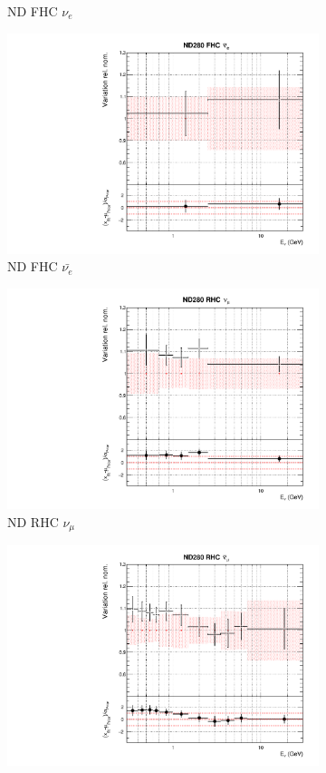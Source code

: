 \begin{figure}
\begin{subfigure}{0.45\textwidth}
  \caption{ND FHC $\nu_{e}$}
\end{subfigure}
\begin{subfigure}{0.45\textwidth}
  \centering
  \includegraphics[width=0.75\linewidth]{figs/datflux3}
  \caption{ND FHC $\bar{\nu_{e}}$}
\end{subfigure}
\begin{subfigure}{0.45\textwidth}
  \centering
  \includegraphics[width=0.75\linewidth]{figs/datflux4}
  \caption{ND RHC $\nu_{\mu}$}
\end{subfigure}
\begin{subfigure}{0.45\textwidth}
  \centering
  \includegraphics[width=0.75\linewidth]{figs/datflux5}

\end{subfigure}
\end{figure}
